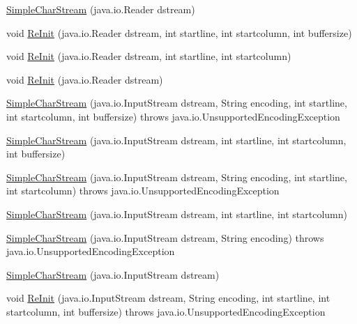 \begin{DoxyCompactItemize}
\item 
\mbox{\hyperlink{classanalizadores_1_1_simple_char_stream_a8cf5c59abc089551cf182a074481cfad}{Simple\+Char\+Stream}} (java.\+io.\+Reader dstream)
\item 
void \mbox{\hyperlink{classanalizadores_1_1_simple_char_stream_a244de250f7d2c63115e0b9dd7edf27d7}{Re\+Init}} (java.\+io.\+Reader dstream, int startline, int startcolumn, int buffersize)
\item 
void \mbox{\hyperlink{classanalizadores_1_1_simple_char_stream_ad88c7f702fffeae097e1bbae81601894}{Re\+Init}} (java.\+io.\+Reader dstream, int startline, int startcolumn)
\item 
void \mbox{\hyperlink{classanalizadores_1_1_simple_char_stream_a1c531cf74a9047ec165d25e6b2b6a428}{Re\+Init}} (java.\+io.\+Reader dstream)
\item 
\mbox{\hyperlink{classanalizadores_1_1_simple_char_stream_a2f543453e34d9d15876263693c2f1ffe}{Simple\+Char\+Stream}} (java.\+io.\+Input\+Stream dstream, String encoding, int startline, int startcolumn, int buffersize)  throws java.\+io.\+Unsupported\+Encoding\+Exception   
\item 
\mbox{\hyperlink{classanalizadores_1_1_simple_char_stream_ac3d2c52438f4d29440590c61b9c321f0}{Simple\+Char\+Stream}} (java.\+io.\+Input\+Stream dstream, int startline, int startcolumn, int buffersize)
\item 
\mbox{\hyperlink{classanalizadores_1_1_simple_char_stream_a277db3968e8f2b76a24f6d90ea9942d9}{Simple\+Char\+Stream}} (java.\+io.\+Input\+Stream dstream, String encoding, int startline, int startcolumn)  throws java.\+io.\+Unsupported\+Encoding\+Exception   
\item 
\mbox{\hyperlink{classanalizadores_1_1_simple_char_stream_a7ffee5e3a468a82be8d5b35933bd9ab0}{Simple\+Char\+Stream}} (java.\+io.\+Input\+Stream dstream, int startline, int startcolumn)
\item 
\mbox{\hyperlink{classanalizadores_1_1_simple_char_stream_a08a7b1c3bc75056cc19bdbcc1ac42306}{Simple\+Char\+Stream}} (java.\+io.\+Input\+Stream dstream, String encoding)  throws java.\+io.\+Unsupported\+Encoding\+Exception   
\item 
\mbox{\hyperlink{classanalizadores_1_1_simple_char_stream_aa148a7b81b78a16ddf2a120531d189cb}{Simple\+Char\+Stream}} (java.\+io.\+Input\+Stream dstream)
\item 
void \mbox{\hyperlink{classanalizadores_1_1_simple_char_stream_aec69ff69d9dfc99d8c011e430107a90a}{Re\+Init}} (java.\+io.\+Input\+Stream dstream, String encoding, int startline, int startcolumn, int buffersize)  throws java.\+io.\+Unsupported\+Encoding\+Exception   

\end{DoxyCompactItemize}
